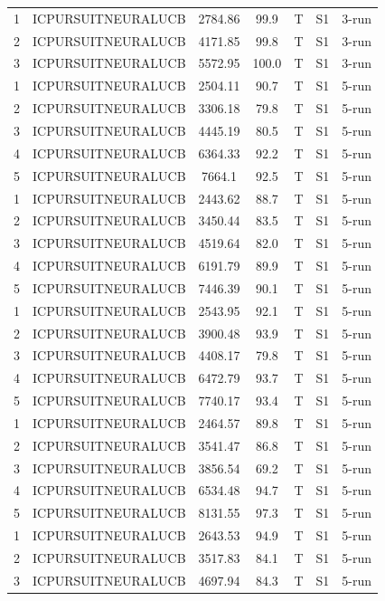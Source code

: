 \documentclass[11pt]{article}
\begin{document}
\begin{center}
\begin{longtable}{|c|c|c|c|c|c|c|}
1 & ICPURSUITNEURALUCB & 2784.86 & 99.9 & T & S1 & 3-run \\
2 & ICPURSUITNEURALUCB & 4171.85 & 99.8 & T & S1 & 3-run \\
3 & ICPURSUITNEURALUCB & 5572.95 & 100.0 & T & S1 & 3-run \\
1 & ICPURSUITNEURALUCB & 2504.11 & 90.7 & T & S1 & 5-run \\
2 & ICPURSUITNEURALUCB & 3306.18 & 79.8 & T & S1 & 5-run \\
3 & ICPURSUITNEURALUCB & 4445.19 & 80.5 & T & S1 & 5-run \\
4 & ICPURSUITNEURALUCB & 6364.33 & 92.2 & T & S1 & 5-run \\
5 & ICPURSUITNEURALUCB & 7664.1 & 92.5 & T & S1 & 5-run \\
1 & ICPURSUITNEURALUCB & 2443.62 & 88.7 & T & S1 & 5-run \\
2 & ICPURSUITNEURALUCB & 3450.44 & 83.5 & T & S1 & 5-run \\
3 & ICPURSUITNEURALUCB & 4519.64 & 82.0 & T & S1 & 5-run \\
4 & ICPURSUITNEURALUCB & 6191.79 & 89.9 & T & S1 & 5-run \\
5 & ICPURSUITNEURALUCB & 7446.39 & 90.1 & T & S1 & 5-run \\
1 & ICPURSUITNEURALUCB & 2543.95 & 92.1 & T & S1 & 5-run \\
2 & ICPURSUITNEURALUCB & 3900.48 & 93.9 & T & S1 & 5-run \\
3 & ICPURSUITNEURALUCB & 4408.17 & 79.8 & T & S1 & 5-run \\
4 & ICPURSUITNEURALUCB & 6472.79 & 93.7 & T & S1 & 5-run \\
5 & ICPURSUITNEURALUCB & 7740.17 & 93.4 & T & S1 & 5-run \\
1 & ICPURSUITNEURALUCB & 2464.57 & 89.8 & T & S1 & 5-run \\
2 & ICPURSUITNEURALUCB & 3541.47 & 86.8 & T & S1 & 5-run \\
3 & ICPURSUITNEURALUCB & 3856.54 & 69.2 & T & S1 & 5-run \\
4 & ICPURSUITNEURALUCB & 6534.48 & 94.7 & T & S1 & 5-run \\
5 & ICPURSUITNEURALUCB & 8131.55 & 97.3 & T & S1 & 5-run \\
1 & ICPURSUITNEURALUCB & 2643.53 & 94.9 & T & S1 & 5-run \\
2 & ICPURSUITNEURALUCB & 3517.83 & 84.1 & T & S1 & 5-run \\
3 & ICPURSUITNEURALUCB & 4697.94 & 84.3 & T & S1 & 5-run \\

\end{longtable}
\end{center}
\end{document}
